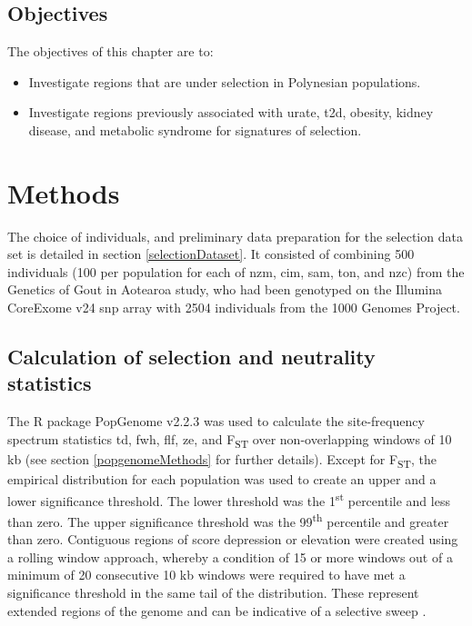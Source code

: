 \documentclass[twoside,openright]{report}
\providecommand{\tightlist}{%
  \setlength{\itemsep}{0pt}\setlength{\parskip}{0pt}}
\begin{document}
\subsection{Objectives}\label{objectives}

The objectives of this chapter are to:

\begin{itemize}
\tightlist
\item
  Investigate regions that are under selection in Polynesian
  populations.
\item
  Investigate regions previously associated with urate, \gls{t2d},
  obesity, kidney disease, and metabolic syndrome for signatures of
  selection.
\end{itemize}

\section{Methods}\label{methods}

The choice of individuals, and preliminary data preparation for the
selection data set is detailed in section \ref{selectionDataset}. It
consisted of combining 500 individuals (100 per population for each of
\gls{nzm}, \gls{cim}, \gls{sam}, \gls{ton}, and \gls{nzc}) from the
Genetics of Gout in Aotearoa study, who had been genotyped on the
Illumina CoreExome v24 \gls{snp} array with 2504 individuals from the
1000 Genomes Project.

\subsection{Calculation of selection and neutrality
statistics}\label{calcSel}

The R package PopGenome v2.2.3 \citep{Pfeifer2014} was used to calculate
the site-frequency spectrum statistics \gls{td}, \gls{fwh}, \gls{flf},
\gls{ze}, and F\textsubscript{ST} over non-overlapping windows of 10 kb
(see section \ref{popgenomeMethods} for further details). Except for
F\textsubscript{ST}, the empirical distribution for each population was
used to create an upper and a lower significance threshold. The lower
threshold was the 1\textsuperscript{st} percentile and less than zero.
The upper significance threshold was the 99\textsuperscript{th}
percentile and greater than zero. Contiguous regions of score depression
or elevation were created using a rolling window approach, whereby a
condition of 15 or more windows out of a minimum of 20 consecutive 10 kb
windows were required to have met a significance threshold in the same
tail of the distribution. These represent extended regions of the genome
and can be indicative of a selective sweep \citep{Carlson2005}.
\end{document}

